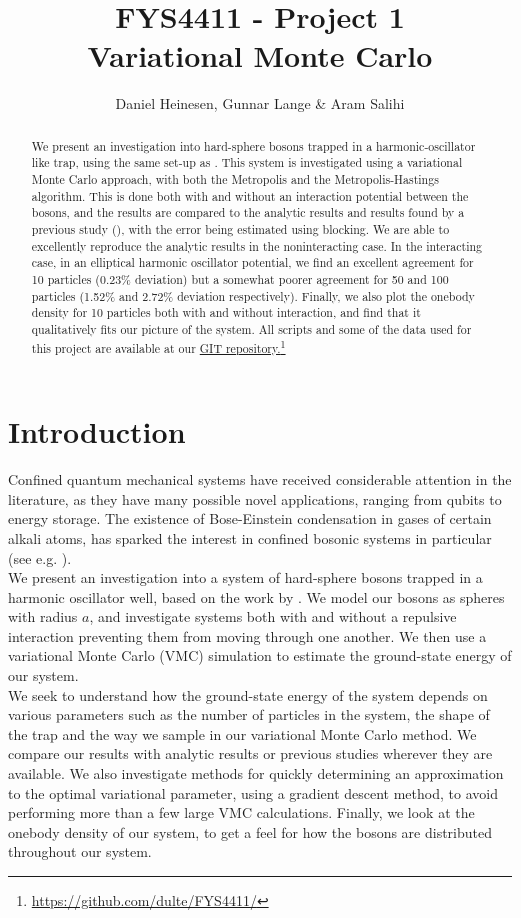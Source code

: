 \documentclass[a4paper, 10pt]{article}
\title{FYS4411 - Project 1\\
	Variational Monte Carlo}
\author{Daniel Heinesen, Gunnar Lange \& Aram Salihi}
\begin{document}
	\maketitle
	\begin{abstract}
	We present an investigation into hard-sphere bosons trapped in a harmonic-oscillator like trap, using the same set-up as \cite{DuBois2001}. This system is investigated using a variational Monte Carlo approach, with both the Metropolis and the Metropolis-Hastings algorithm. This is done both with and without an interaction potential between the bosons, and the results are compared to the analytic results and results found by a previous study (\cite{Kristiansen2016}), with the error being estimated using blocking. We are able to excellently reproduce the analytic results in the noninteracting case. In the interacting case, in an elliptical harmonic oscillator potential, we find an excellent agreement for 10 particles (0.23\% deviation) but a somewhat poorer agreement for 50 and 100 particles (1.52\% and 2.72\% deviation respectively).
	Finally, we also plot the onebody density for 10 particles both with and without interaction, and find that it qualitatively fits our picture of the system. All scripts and some of the data used for this project are available at our \href{https://github.com/dulte/FYS4411/}{GIT repository.}\footnote{\url{https://github.com/dulte/FYS4411/}}
	\end{abstract}
	\tableofcontents
	\section{Introduction}
	Confined quantum mechanical systems have received considerable attention in the literature, as they have many possible novel applications, ranging from qubits to energy storage. The existence of Bose-Einstein condensation in gases of certain alkali atoms, has sparked the interest in confined bosonic systems in particular (see e.g. \cite{Nilsen2005}). \\
	\linebreak
	We present an investigation into a system of hard-sphere bosons trapped in a harmonic oscillator well, based on the work by \cite{DuBois2001}. We model our bosons as spheres with radius $a$, and investigate systems both with and without a repulsive interaction preventing them from moving through one another. We then use a variational Monte Carlo (VMC) simulation to estimate the ground-state energy of our system.\\
	\linebreak
	 We seek to understand how the ground-state energy of the system depends on various parameters such as the number of particles in the system, the shape of the trap and the way we sample in our variational Monte Carlo method. We compare our results with analytic results or previous studies wherever they are available. We also investigate methods for quickly determining an approximation to the optimal variational parameter, using a gradient descent method, to avoid performing more than a few large VMC calculations. Finally, we look at the onebody density of our system, to get a feel for how the bosons are distributed throughout our system.
\end{document}
